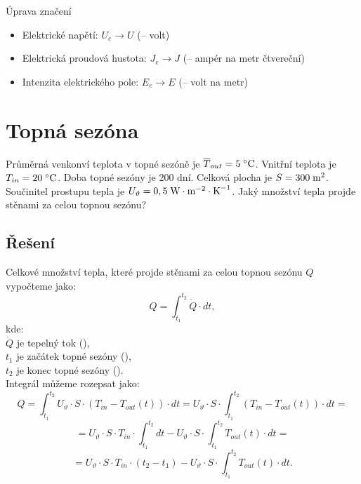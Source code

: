 \documentclass{article}
\begin{document}
\maketitle
\tableofcontents
\vspace{1cm}

\begin{dangerbox}{Úprava značení}
    \begin{itemize}
        \item Elektrické napětí: $U_e \rightarrow U$ (\ueqV \fs -- volt)
        \item Elektrická proudová hustota: $J_e \rightarrow J$ (\ueqAandMinvsq \fs -- ampér na metr čtvereční)
        \item Intenzita elektrického pole: $E_e \rightarrow E$ (\ueqVandMinv \fs -- volt na metr)
    \end{itemize}
\end{dangerbox}

\newpage




\section{ Topná sezóna \spicy \spicy \spicy}
Průměrná venkonví teplota v topné sezóně je $\overline{T}_{out} = 5 \; ^\circ \textrm{C}$. Vnitřní teplota je $T_{in} = 20 \; ^\circ \textrm{C}$. Doba topné sezóny je 200 dní. Celková plocha je $S = 300 \; \textrm{m}^{\textrm{2}}$. Součinitel prostupu tepla je $U_\vartheta = 0,5 \; \textrm{W} \cdot \textrm{m}^{-2} \cdot \textrm{K}^{-1}$. Jaký množství tepla projde stěnami za celou topnou sezónu?



\subsection{Řešení}
Celkové množství tepla, které projde stěnami za celou topnou sezónu $Q$ vypočteme jako:
$$
    Q = \int_{t_1}^{t_2} \dot{Q} \cdot dt,
$$
kde:\\
$\dot{Q}$ je tepelný tok (\ueqW),\\
$t_1$ je začátek topné sezóny (\uH),\\
$t_2$ je konec topné sezóny (\uH).\\

Integrál můžeme rozepsat jako:
$$
    Q = \int_{t_1}^{t_2} U_\vartheta \cdot S \cdot (T_{in} - T_{out} (t)) \cdot dt = U_\vartheta \cdot S \cdot \int_{t_1}^{t_2} (T_{in} - T_{out} (t)) \cdot dt =
$$
$$
    = U_\vartheta \cdot S \cdot T_{in} \cdot \int_{t_1}^{t_2} dt - U_\vartheta \cdot S \cdot \int_{t_1}^{t_2} T_{out} (t) \cdot dt =
$$
$$
    = U_\vartheta \cdot S \cdot T_{in} \cdot (t_2 - t_1) - U_\vartheta \cdot S \cdot \int_{t_1}^{t_2} T_{out} (t) \cdot dt.
$$
\end{document}
